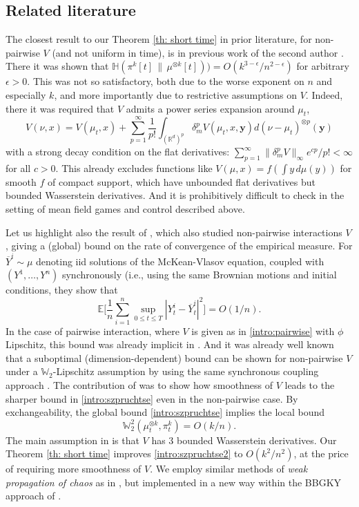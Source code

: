 \documentclass[11pt,reqno]{amsart}
\numberwithin{equation}{section}
\theoremstyle{definition}
\def\E{{\mathbb E}}
\def\R{{\mathbb R}}
\newcommand{\W}{\mathbb W}
\newcommand{\ent}{ \mathbb H}
\begin{document}
\subsection{Related literature}
The closest result to  our Theorem \ref{th: short time} in prior literature, for non-pairwise $V$ (and not uniform in time), is in previous work of the second author \cite[Theorem 2.17, Corollary 2.18]{HierarchiesPaper}. There it was shown that  $\ent(\pi^k[t]\,\|\,\mu^{\otimes k}[t])) = O(k^{3-\epsilon}/n^{2-\epsilon})$ for arbitrary $\epsilon > 0$. This was not so satisfactory, both due to the worse exponent on $n$ and especially $k$, and more importantly due to restrictive assumptions on $V$. Indeed, there it was required that $V$ admits a power series expansion around $\mu_t$,
\[
V(\nu,x)= V(\mu_t,x)+\sum_{p=1}^\infty \frac{1}{p!}\int_{(\R^d)^p} \delta_m^p  V(\mu_t,x,\boldsymbol{y})d(\nu-\mu_t)^{\otimes p}(\boldsymbol{y})
\]
with a strong decay condition on the flat derivatives:  $\sum_{p=1}^\infty \|\delta_m^p  V\|_\infty e^{cp}/p! < \infty$ for all $c > 0$. This already excludes functions like $ V(\mu,x)=f(\int y\,d\mu(y))$ for smooth $f$ of compact support, which have unbounded flat derivatives but bounded Wasserstein derivatives. And it is prohibitively difficult to check in the setting of mean field games and control described above.

Let us highlight also the result of  \cite[Theorem 4.2]{Szpruch-Tse-sampling}, which also studied non-pairwise interactions $V$, giving a (global) bound on the rate of convergence of the empirical measure. For $\overline{Y}^i\sim\mu$ denoting iid solutions of the McKean-Vlasov equation, coupled with $(Y^1,\ldots,Y^n)$ synchronously (i.e., using the same Brownian motions and initial conditions, they show that
\begin{equation}
\E\bigg[ \frac{1}{n}\sum_{i=1}^n\sup_{0 \le t \le T}|Y^i_t-\overline{Y}^i_t|^2 \bigg] = O(1/n). \label{intro:szpruchtse}
\end{equation}
In the case of pairwise interaction, where $V$ is given as in \ref{intro:pairwise} with $\phi$ Lipschitz, this bound was already implicit in \cite{snitzmann}. And it was already well known that a suboptimal (dimension-dependent) bound can be shown for non-pairwise $V$ under a $\W_2$-Lipschitz assumption by using the same synchronous coupling approach \cite[Theorem 1.20]{carmona2016lectures}.
The contribution of \cite[Theorem 4.2]{Szpruch-Tse-sampling} was to show how smoothness of $V$ leads to the sharper bound in \eqref{intro:szpruchtse} even in the non-pairwise case.
By exchangeability, the global bound \eqref{intro:szpruchtse} implies the local bound
\begin{equation}
    \W_2^2(\mu^{\otimes k}_t,\pi_t^k)=O(k/n). \label{intro:szpruchtse2}
\end{equation}
The main assumption in \cite[Theorem 4.2]{Szpruch-Tse-sampling} is that $ V$ has 3 bounded Wasserstein derivatives. Our Theorem \ref{th: short time} improves \eqref{intro:szpruchtse2} to $O(k^2/n^2)$, at the price of requiring more smoothness of $V$. We employ similar methods of \emph{weak propagation of chaos} as in \cite{Szpruch-Tse-sampling}, but implemented in a new way within the BBGKY approach of \cite{HierarchiesPaper}.
\end{document}
